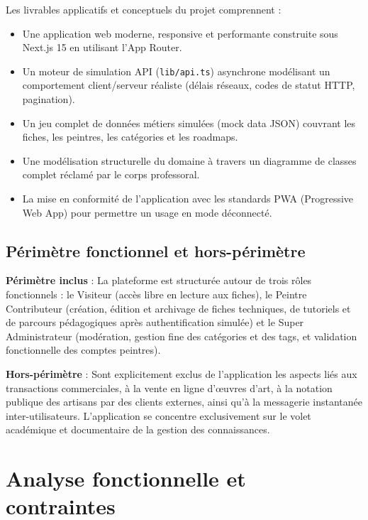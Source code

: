 \documentclass[12pt,a4paper]{report}
\begin{document}
Les livrables applicatifs et conceptuels du projet comprennent :
\begin{itemize}
    \item Une application web moderne, responsive et performante construite sous Next.js 15 en utilisant l'App Router.
    \item Un moteur de simulation API (\texttt{lib/api.ts}) asynchrone modélisant un comportement client/serveur réaliste (délais réseaux, codes de statut HTTP, pagination).
    \item Un jeu complet de données métiers simulées (mock data JSON) couvrant les fiches, les peintres, les catégories et les roadmaps.
    \item Une modélisation structurelle du domaine à travers un diagramme de classes complet réclamé par le corps professoral.
    \item La mise en conformité de l'application avec les standards PWA (Progressive Web App) pour permettre un usage en mode déconnecté.
\end{itemize}

\subsection*{Périmètre fonctionnel et hors-périmètre}

\textbf{Périmètre inclus} : La plateforme est structurée autour de trois rôles fonctionnels : le Visiteur (accès libre en lecture aux fiches), le Peintre Contributeur (création, édition et archivage de fiches techniques, de tutoriels et de parcours pédagogiques après authentification simulée) et le Super Administrateur (modération, gestion fine des catégories et des tags, et validation fonctionnelle des comptes peintres).

\textbf{Hors-périmètre} : Sont explicitement exclus de l'application les aspects liés aux transactions commerciales, à la vente en ligne d'œuvres d'art, à la notation publique des artisans par des clients externes, ainsi qu'à la messagerie instantanée inter-utilisateurs. L'application se concentre exclusivement sur le volet académique et documentaire de la gestion des connaissances.

\newpage

\newpage
\section{Analyse fonctionnelle et contraintes}
\end{document}
